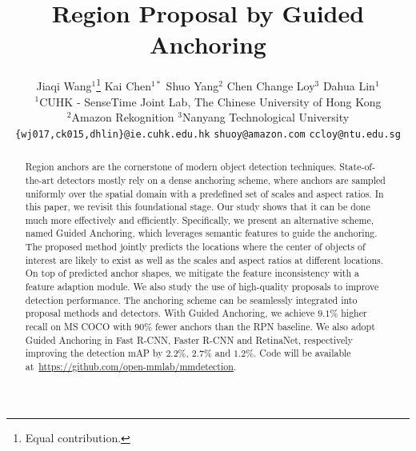 \documentclass[10pt,twocolumn,letterpaper]{article}
\begin{document}
\title{Region Proposal by Guided Anchoring}

\author{Jiaqi Wang$^{1}$\thanks{Equal contribution.} \quad Kai Chen$^{1*}$ \quad Shuo Yang$^2$ \quad Chen Change Loy$^3$ \quad Dahua Lin$^1$\\
	$^1$CUHK - SenseTime Joint Lab, The Chinese University of Hong Kong \\
	$^2$Amazon Rekognition \hspace{10pt} $^3$Nanyang Technological University\\
	{\tt\small \{wj017,ck015,dhlin\}@ie.cuhk.edu.hk}\hspace{10pt}
	{\tt\small shuoy@amazon.com}\hspace{10pt}
	{\tt\small ccloy@ntu.edu.sg}
}

\maketitle
\thispagestyle{empty}



\begin{abstract}

Region anchors are the cornerstone of modern object detection techniques.
State-of-the-art detectors mostly rely on a dense anchoring scheme,
where anchors are sampled uniformly over the spatial domain with
a predefined set of scales and aspect ratios.
In this paper, we revisit this foundational stage. Our study shows that
it can be done much more effectively and efficiently.
Specifically, we present an alternative scheme, named Guided Anchoring,
which leverages semantic features to guide the anchoring.
The proposed method jointly predicts the locations where the center of objects of interest
are likely to exist as well as the scales and aspect ratios at different locations.
On top of predicted anchor shapes, we mitigate the feature inconsistency with a feature adaption module.
We also study the use of high-quality proposals to improve detection performance.
The anchoring scheme can be seamlessly integrated into proposal methods and detectors.
With Guided Anchoring, we achieve $9.1\%$ higher recall on MS COCO
with $90\%$ fewer anchors than the RPN baseline.
We also adopt Guided Anchoring in Fast R-CNN, Faster R-CNN and RetinaNet,
respectively improving the detection mAP by $2.2\%$, $2.7\%$ and $1.2\%$.
Code will be available at~\url{https://github.com/open-mmlab/mmdetection}.

\end{abstract}
 
\end{document}
